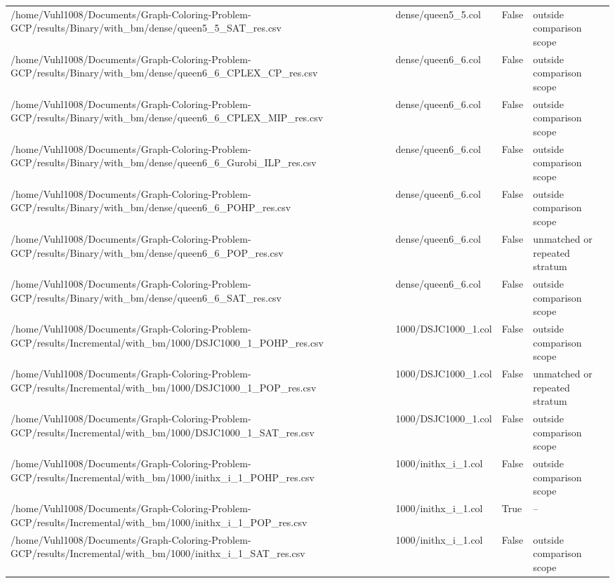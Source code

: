 \begin{table}[htbp]
\begin{tabular}{llll}
/home/Vuhl1008/Documents/Graph-Coloring-Problem-GCP/results/Binary/with\_bm/dense/queen5\_5\_SAT\_res.csv & dense/queen5\_5.col & False & outside comparison scope \\
/home/Vuhl1008/Documents/Graph-Coloring-Problem-GCP/results/Binary/with\_bm/dense/queen6\_6\_CPLEX\_CP\_res.csv & dense/queen6\_6.col & False & outside comparison scope \\
/home/Vuhl1008/Documents/Graph-Coloring-Problem-GCP/results/Binary/with\_bm/dense/queen6\_6\_CPLEX\_MIP\_res.csv & dense/queen6\_6.col & False & outside comparison scope \\
/home/Vuhl1008/Documents/Graph-Coloring-Problem-GCP/results/Binary/with\_bm/dense/queen6\_6\_Gurobi\_ILP\_res.csv & dense/queen6\_6.col & False & outside comparison scope \\
/home/Vuhl1008/Documents/Graph-Coloring-Problem-GCP/results/Binary/with\_bm/dense/queen6\_6\_POHP\_res.csv & dense/queen6\_6.col & False & outside comparison scope \\
/home/Vuhl1008/Documents/Graph-Coloring-Problem-GCP/results/Binary/with\_bm/dense/queen6\_6\_POP\_res.csv & dense/queen6\_6.col & False & unmatched or repeated stratum \\
/home/Vuhl1008/Documents/Graph-Coloring-Problem-GCP/results/Binary/with\_bm/dense/queen6\_6\_SAT\_res.csv & dense/queen6\_6.col & False & outside comparison scope \\
/home/Vuhl1008/Documents/Graph-Coloring-Problem-GCP/results/Incremental/with\_bm/1000/DSJC1000\_1\_POHP\_res.csv & 1000/DSJC1000\_1.col & False & outside comparison scope \\
/home/Vuhl1008/Documents/Graph-Coloring-Problem-GCP/results/Incremental/with\_bm/1000/DSJC1000\_1\_POP\_res.csv & 1000/DSJC1000\_1.col & False & unmatched or repeated stratum \\
/home/Vuhl1008/Documents/Graph-Coloring-Problem-GCP/results/Incremental/with\_bm/1000/DSJC1000\_1\_SAT\_res.csv & 1000/DSJC1000\_1.col & False & outside comparison scope \\
/home/Vuhl1008/Documents/Graph-Coloring-Problem-GCP/results/Incremental/with\_bm/1000/inithx\_i\_1\_POHP\_res.csv & 1000/inithx\_i\_1.col & False & outside comparison scope \\
/home/Vuhl1008/Documents/Graph-Coloring-Problem-GCP/results/Incremental/with\_bm/1000/inithx\_i\_1\_POP\_res.csv & 1000/inithx\_i\_1.col & True & -- \\
/home/Vuhl1008/Documents/Graph-Coloring-Problem-GCP/results/Incremental/with\_bm/1000/inithx\_i\_1\_SAT\_res.csv & 1000/inithx\_i\_1.col & False & outside comparison scope \\

\end{tabular}
\end{table}
